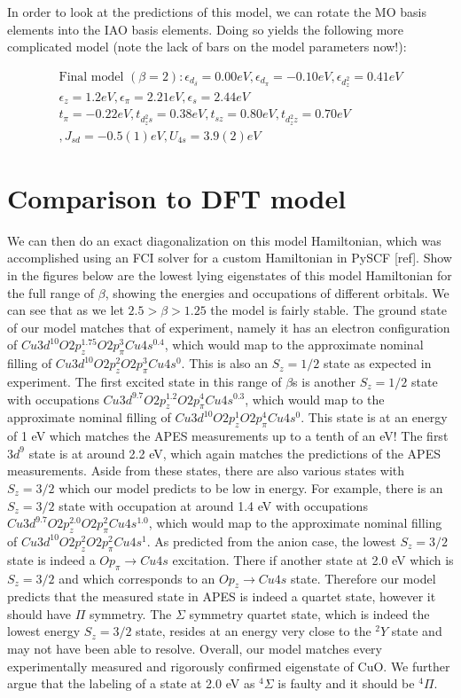 \documentclass{article}
\begin{document}
In order to look at the predictions of this model, we can rotate the MO basis elements into the IAO basis elements. Doing so yields the following more complicated model (note the lack of bars on the model parameters now!):

\begin{multline}
 \boxed{\text{Final model }  (\beta=2): \epsilon_{d_\delta} = 0.00 eV, \epsilon_{d_\pi} = -0.10 eV, \epsilon_{d_z^2} = 0.41 eV }\\
 \boxed{\epsilon_z = 1.2 eV, \epsilon_\pi = 2.21 eV, \epsilon_s = 2.44 eV}\\
\boxed{t_\pi = -0.22 eV, t_{d_z^2 s} = 0.38 eV, t_{s z} = 0.80 eV, t_{d_z^2 z} = 0.70 eV}\\
\boxed{ , J_{sd} = -0.5(1) eV, U_{4s} = 3.9(2) eV}
\end{multline}

\section{Comparison to DFT model}
We can then do an exact diagonalization on this model Hamiltonian, which was accomplished using an FCI solver for a custom Hamiltonian in PySCF [ref]. Show in the figures below are the lowest lying eigenstates of this model Hamiltonian for the full range of $\beta$, showing the energies and occupations of different orbitals. We can see that as we let $2.5 > \beta > 1.25 $ the model is fairly stable. The ground state of our model matches that of experiment, namely it has an electron configuration of $Cu 3d^{10} O 2p_z^{1.75} O 2p_\pi^3 Cu 4s^{0.4}$, which would map to the approximate nominal filling of $Cu 3d^{10} O 2p_z^{2} O 2p_\pi^3 Cu 4s^{0}.$ This is also an $S_z=1/2$ state as expected in experiment. The first excited state in this range of $\beta$s is another $S_z=1/2$ state with occupations $Cu 3d^{9.7} O 2p_z^{1.2} O 2p_\pi^4 Cu 4s^{0.3}$, which would map to the approximate nominal filling of $Cu 3d^{10} O 2p_z^{1} O 2p_\pi^4 Cu 4s^{0}.$ This state is at an energy of 1 eV which matches the APES measurements up to a tenth of an eV! The first $3d^9$ state is at around 2.2 eV, which again matches the predictions of the APES measurements. Aside from these states, there are also various states with $S_z=3/2$ which our model predicts to be low in energy. For example, there is an $S_z=3/2$ state with occupation at around 1.4 eV with occupations $Cu 3d^{9.7} O 2p_z^{2.0} O 2p_\pi^2 Cu 4s^{1.0}$, which would map to the approximate nominal filling of $Cu 3d^{10} O 2p_z^{2} O 2p_\pi^2 Cu 4s^{1}.$ As predicted from the anion case, the lowest $S_z=3/2$ state is indeed a $O p_\pi \rightarrow Cu 4s$ excitation. There if another state at 2.0 eV which is $S_z =3/2$ and which corresponds to an $O p_z \rightarrow Cu 4s$ state. Therefore our model predicts that the measured state in APES is indeed a quartet state, however it should have $\Pi$ symmetry. The $\Sigma$ symmetry quartet state, which is indeed the lowest energy $S_z=3/2$ state, resides at an energy very close to the $^2Y$ state and may not have been able to resolve. Overall, our model matches every experimentally measured and rigorously confirmed eigenstate of CuO. We further argue that the labeling of a state at 2.0 eV as $^4\Sigma$ is faulty and it should be $^4\Pi$.
\end{document}
